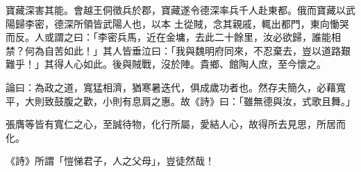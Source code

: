 \begin{pinyinscope}
 寶藏深害其能。會越王侗徵兵於郡，寶藏遂令德深率兵千人赴東都。俄而寶藏以武陽歸李密，德深所領皆武陽人也，以本
 土從賊，念其親戚，輒出都門，東向慟哭而反。人或謂之曰：「李密兵馬，近在金墉，去此二十餘里，汝必欲歸，誰能相禁？何為自苦如此！」其人皆垂泣曰：「我與魏明府同來，不忍棄去，豈以道路艱難乎！」其得人心如此。後與賊戰，沒於陣。貴鄉、館陶人庶，至今懷之。



 論曰：為政之道，寬猛相濟，猶寒暑迭代，俱成歲功者也。然存夫簡久，必藉寬平，大則致鼓腹之歡，小則有息肩之惠。故《詩》曰：「雖無德與汝，式歌且舞。」



 張膺等皆有寬仁之心，至誠待物，化行所屬，愛結人心，故得所去見思，所居而化。



 《詩》所謂「愷悌君子，人之父母」，豈徒然哉！



\end{pinyinscope}